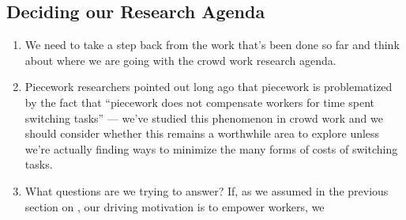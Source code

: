 \documentclass[trackingWork]{subfiles}
\begin{document}
\subsection{Deciding our Research Agenda}\label{sec:whatShouldBeTheFuture}
\begin{enumerate}
  \item We need to take a step back from the work that's been done so far and
        think about where we are going with the crowd work research agenda.
  \item Piecework researchers pointed out long ago that piecework is problematized by the fact that
        ``piecework does not compensate workers for time spent switching tasks''
        \cite{bewley1999wages} --- we've studied this phenomenon in crowd work
        \cite{delayAndOrderLasecki,taskSearch}
        and we should consider whether this remains a worthwhile area to explore unless
        we're actually finding ways to minimize the many forms of costs of switching tasks.
  \item What questions are we trying to answer?
        If, as we assumed in
        the previous section on ,
        our driving motivation is to empower workers, we 

\end{enumerate}



\onlyinsubfile{
  \balance{}
  \printbibliography
}
\end{document}
